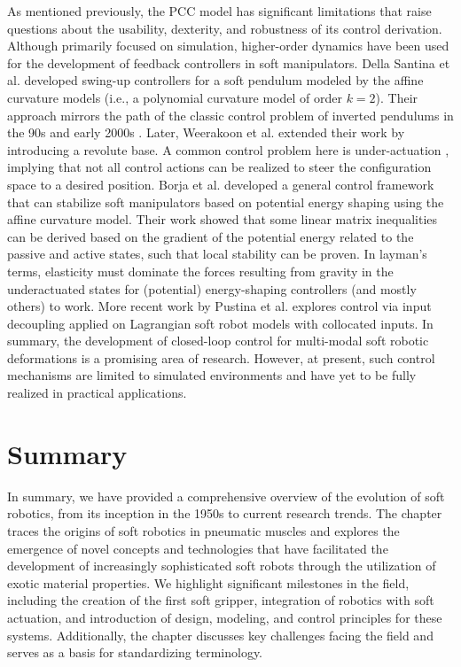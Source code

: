 As mentioned previously, the PCC model has significant limitations that raise questions about the usability, dexterity, and robustness of its control derivation. Although primarily focused on simulation, higher-order dynamics have been used for the development of feedback controllers in soft manipulators. Della Santina et al. \cite{DellaSantina2020Dec} developed swing-up controllers for a soft pendulum modeled by the affine curvature models (i.e., a polynomial curvature model \cite{DellaSantina2020} of order $k = 2$). Their approach mirrors the path of the classic control problem of inverted pendulums in the 90s and early 2000s \cite{Spong1996,Spong1994,Ortega1998,Shiriaev1999Dec}. Later, Weerakoon et al. \cite{Weerakoon2021Dec} extended their work by introducing a revolute base. A common control problem here is under-actuation \cite{Tedrake2022,Spong2006,Murray1994}, implying that not all control actions can be realized to steer the configuration space to a desired position. Borja et al. \cite{Borja2022Apr} developed a general control framework that can stabilize soft manipulators based on potential energy shaping using the affine curvature model. Their work showed that some linear matrix inequalities can be derived based on the gradient of the potential energy related to the passive and active states, such that local stability can be proven. In layman's terms, elasticity must dominate the forces resulting from gravity in the underactuated states for (potential) energy-shaping controllers (and mostly others) to work. More recent work by Pustina et al. \cite{Pustina2023Jun} explores control via input decoupling applied on Lagrangian soft robot models with collocated inputs. In summary, the development of closed-loop control for multi-modal soft robotic deformations is a promising area of research. However, at present, such control mechanisms are limited to simulated environments and have yet to be fully realized in practical applications.

\section{Summary}
In summary, we have provided a comprehensive overview of the evolution of soft robotics, from its inception in the 1950s to current research trends. The chapter traces the origins of soft robotics in pneumatic muscles and explores the emergence of novel concepts and technologies that have facilitated the development of increasingly sophisticated soft robots through the utilization of exotic material properties. We highlight significant milestones in the field, including the creation of the first soft gripper, integration of robotics with soft actuation, and introduction of design, modeling, and control principles for these systems. Additionally, the chapter discusses key challenges facing the field and serves as a basis for standardizing terminology.